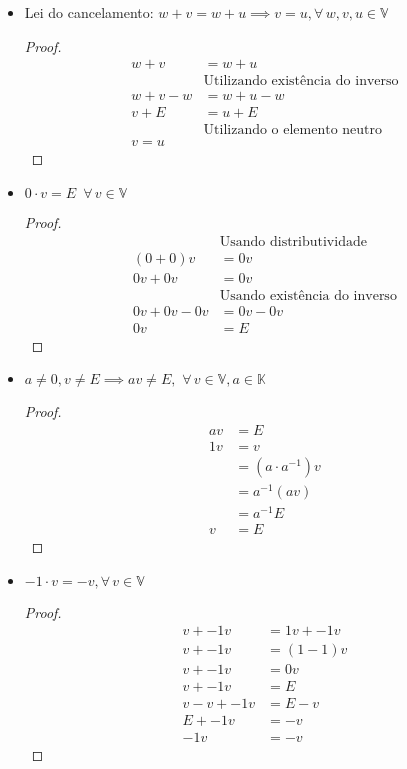 \documentclass{article}
\theoremstyle{plain}
\theoremstyle{definition}
\theoremstyle{remark}
\numberwithin{equation}{section}
\numberwithin{thm}{section}
\begin{document}
\begin{itemize}
	\item Lei do cancelamento: \(w + v = w + u \implies v = u, \forall \, w, v, u \in \mathbb{V}\)
	\begin{proof}
		\begin{align*}
			w + v &= w + u\\
			&\text{Utilizando existência do inverso}\\
			w + v - w &= w + u - w\\
			v + E &= u + E\\
			&\text{Utilizando o elemento neutro}\\
			v = u
		\end{align*}		
		\end{proof}
		\item \( 0\cdot v = E \, \, \, \forall \,  v \in \mathbb{V}\)
	\begin{proof}
		\begin{align*}
			&\text{Usando distributividade}\\
			(0+0) v &= 0v \\
			0v + 0v &= 0v \\
			&\text{Usando existência do inverso}\\
			0v + 0v - 0v &= 0v - 0v \\
			0v &= E
		\end{align*}		
	\end{proof}
			\item \( a \neq 0, v \neq E \implies av \neq E, \, \, \forall \,  v \in \mathbb{V}, a \in \mathbb{K}\)
	\begin{proof}
		\begin{align*}
			av &= E \\
			1v &= v\\
			&= (a \cdot a^{-1}) v\\
			&= a^{-1}(av) \\
			&=a^{-1} E\\
			v &= E
		\end{align*}		
	\end{proof}
	\item \(-1 \cdot v = -v, \forall \, v \in \mathbb{V}\)
	\begin{proof}
		\begin{align*}
			v + -1v &= 1v + -1v\\
			v + -1v &= (1 - 1) v\\
			v + -1v &= 0v\\
			v + -1v &= E\\
			v - v + -1v &= E -v\\
			E + -1v &= -v\\
			-1v &= -v			
		\end{align*}
	\end{proof}
\end{itemize}
\end{document}
